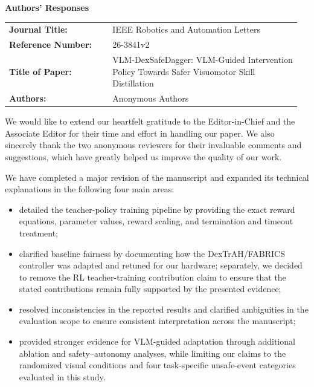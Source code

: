 \documentclass[11pt]{article}
\newcommand{\manuscriptid}{26-3841v2}
\newcommand{\papertitle}{VLM-DexSafeDagger: VLM-Guided Intervention Policy Towards Safer Visuomotor Skill Distillation}
\newcounter{reviewer}
\begin{document}

\begin{center}
  {\Large\bfseries Authors' Responses}\par
\end{center}

\vspace{2em}
\begin{tabular}{@{}p{0.34\linewidth}p{0.62\linewidth}@{}}
\textbf{Journal Title:} & IEEE Robotics and Automation Letters \\
\textbf{Reference Number:} & \manuscriptid \\
\textbf{Title of Paper:} & \papertitle \\
\textbf{Authors:} & Anonymous Authors
\end{tabular}

\vspace{2em}
We would like to extend our heartfelt gratitude to the Editor-in-Chief and the
Associate Editor for their time and effort in handling our paper. We also
sincerely thank the two anonymous reviewers for their invaluable comments and
suggestions, which have greatly helped us improve the quality of our work.

We have completed a major revision of the manuscript and expanded its technical
explanations in the following four main areas:
\begin{itemize}[leftmargin=2em,itemsep=6pt,topsep=4pt]
  \item detailed the teacher-policy training pipeline by providing the exact
  reward equations, parameter values, reward scaling, and termination and
  timeout treatment;
  \item clarified baseline fairness by documenting how the DexTrAH/FABRICS
  controller was adapted and retuned for our hardware; separately, we decided
  to remove the RL teacher-training contribution claim to ensure that the stated
  contributions remain fully supported by the presented evidence;
  \item resolved inconsistencies in the reported results and clarified
  ambiguities in the evaluation scope to ensure consistent interpretation
  across the manuscript;
  \item provided stronger evidence for VLM-guided adaptation through additional
  ablation and safety--autonomy analyses, while limiting our claims to the
  randomized visual conditions and four task-specific unsafe-event categories
  evaluated in this study.
\end{itemize}
\end{document}

